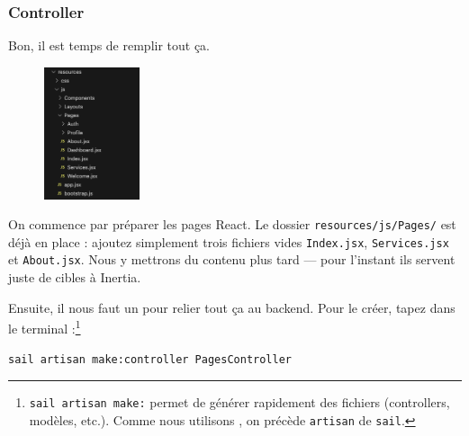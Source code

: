 \subsubsection[Controller][laravel.com/docs/12.x/controllers\#introduction]{Controller}

Bon, il est temps de remplir tout ça.

\begin{figure}
    \includegraphics[width=0.25\textwidth]{figures-C1/first_views.png}
\end{figure}


On commence par préparer les pages React.  
Le dossier \verb|resources/js/Pages/| est déjà en place : ajoutez simplement trois fichiers vides \verb|Index.jsx|, \verb|Services.jsx| et \verb|About.jsx|.  
Nous y mettrons du contenu plus tard — pour l’instant ils servent juste de cibles à Inertia.

Ensuite, il nous faut un \controller{} pour relier tout ça au backend.  
Pour le créer, tapez dans le terminal :\footnote{\verb|sail artisan make:| permet de générer rapidement des fichiers (controllers, modèles, etc.).  
Comme nous utilisons \laravelsail{}, on précède \texttt{artisan} de \texttt{sail}.}

\begin{lstlisting}[language=bash]
sail artisan make:controller PagesController
\end{lstlisting}



